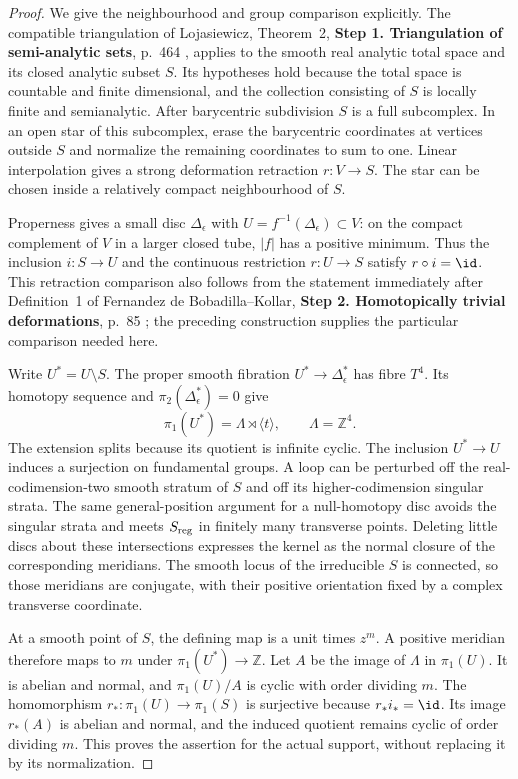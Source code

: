 \begin{proof}
We give the neighbourhood and group comparison explicitly.
The compatible triangulation of Lojasiewicz, Theorem~2,
\noindent\textbf{Step 1. Triangulation of semi-analytic sets}, p.~464 \cite{Lojasiewicz1964}, applies to
the smooth real analytic total space and its closed analytic
subset $S$. Its hypotheses hold because the total space is
countable and finite dimensional, and the collection consisting
of $S$ is locally finite and semianalytic. After barycentric
subdivision $S$ is a full subcomplex. In an open star of this
subcomplex, erase the barycentric coordinates at vertices
outside $S$ and normalize the remaining coordinates to sum
to one. Linear interpolation gives a strong deformation
retraction $r:V\to S$. The star can be chosen inside a
relatively compact neighbourhood of $S$.

Properness gives a small disc $\Delta_\epsilon$ with
$U=f^{-1}(\Delta_\epsilon)\subset V$: on the compact
complement of $V$ in a larger closed tube, $|f|$ has a
positive minimum. Thus the inclusion $i:S\to U$ and the
continuous restriction $r:U\to S$ satisfy $r\circ i=\id$.
This retraction comparison also follows from the statement
immediately after Definition~1 of Fernandez de Bobadilla--Kollar,
\noindent\textbf{Step 2. Homotopically trivial deformations}, p.~85 \cite{BobadillaKollar2012}; the preceding
construction supplies the particular comparison needed here.

Write $U^*=U\setminus S$. The proper smooth fibration
$U^*\to\Delta_\epsilon^*$ has fibre $T^4$. Its homotopy
sequence and $\pi_2(\Delta_\epsilon^*)=0$ give
\[
 \pi_1(U^*)=\Lambda\rtimes\langle t\rangle,
 \qquad \Lambda=\mathbb Z^4.
\]
The extension splits because its quotient is infinite cyclic.
The inclusion $U^*\to U$ induces a surjection on fundamental
groups. A loop can be perturbed off the real-codimension-two
smooth stratum of $S$ and off its higher-codimension singular
strata. The same general-position argument for a null-homotopy
disc avoids the singular strata and meets $S_{\rm reg}$ in
finitely many transverse points. Deleting little discs about
these intersections expresses the kernel as the normal closure
of the corresponding meridians. The smooth locus of the
irreducible $S$ is connected, so those meridians are conjugate,
with their positive orientation fixed by a complex transverse
coordinate.

At a smooth point of $S$, the defining map is a unit times
$z^m$. A positive meridian therefore maps to $m$ under
$\pi_1(U^*)\to\mathbb Z$. Let $A$ be the image of $\Lambda$
in $\pi_1(U)$. It is abelian and normal, and
$\pi_1(U)/A$ is cyclic with order dividing $m$.
The homomorphism $r_*:\pi_1(U)\to\pi_1(S)$ is surjective
because $r_*i_*=\id$. Its image $r_*(A)$ is abelian and
normal, and the induced quotient remains cyclic of order
dividing $m$. This proves the assertion for the actual support,
without replacing it by its normalization.
\end{proof}



